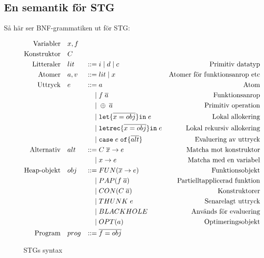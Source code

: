 \documentclass[../Core]{subfiles}
\begin{document}
\subsection{En semantik för STG}
\label{sec:SemStg}






Så här ser BNF-grammatiken ut för STG:

\begin{figure}[H]
\begin{equation*}
\begin{aligned}
\text{Variabler} \quad & x,f \\
\text{Konstruktor} \quad & C \\
\text{Litteraler}\quad&lit&::=&\;i \; | \;  d \;|\; c&\text{Primitiv datatyp} \\
\text{Atomer}\quad&a, v&::=&\;lit \; | \; x&\text{Atomer för funktionsanrop etc} \\
\text{Uttryck}\quad&e&::=&\;a&\text{Atom} \\
    &&|&\;f \; \overline{a}&\text{Funktionsanrop} \\
    &&|&\;\oplus \; \overline{a}&\text{Primitiv operation} \\
    &&|&\;\mathtt{let \{} \overline{x = obj} \mathtt{ \} in } \; e&\text{Lokal allokering} \\
    &&|&\;\mathtt{letrec \{} \overline{x = obj} \mathtt{ \} in } \; e&\text{Lokal rekursiv allokering} \\
    &&|&\;\mathtt{case} \; e \;  \mathtt{ of \{ } \overline{alt} \mathtt{\}}&\text{Evaluering av uttryck} \\
\text{Alternativ}\quad&alt&::=&\;C \; \overline{x} \rightarrow e&\text{Matcha mot konstruktor} \\
    &&|&\;x \rightarrow e&\text{Matcha med en variabel} \\
\text{Heap-objekt}\quad&obj&::=&\;FUN(\overline{x} \rightarrow e)&\text{Funktionsobjekt} \\
    &&|&\;PAP(f \; \overline{a})&\text{Partielltapplicerad funktion} \\
    &&|&\;CON(C \; \overline{a})&\text{Konstruktorer} \\
    &&|&\;THUNK \; e&\text{Senarelagt uttryck} \\
    &&|&\;BLACKHOLE&\text{Används för evaluering} \\
    &&|&\;OPT(a)&\text{Optimeringsobjekt} \\
\text{Program}\quad&prog&::=&\;\overline{f=obj}&\text{}
\end{aligned}
\end{equation*}
\caption{STGs syntax}
\end{figure}
\end{document}
